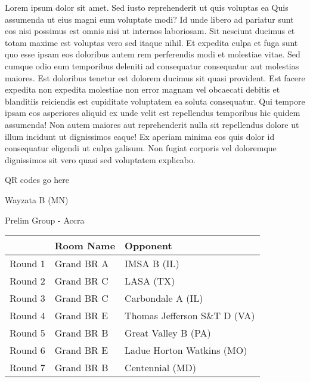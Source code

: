 \documentclass{article}%
\begin{document}
\vspace*{8pt}%
\linebreak%
\newline%
\newline%
Lorem ipsum dolor sit amet. Sed iusto reprehenderit ut quis voluptas ea Quis assumenda ut eius magni eum voluptate modi? Id unde libero ad pariatur sunt eos nisi possimus est omnis nisi ut internos laboriosam. Sit nesciunt ducimus et totam maxime est voluptas vero sed itaque nihil. Et expedita culpa et fuga sunt quo esse ipsam eos doloribus autem rem perferendis modi et molestiae vitae.\newline%
\newline%
Sed cumque odio eum temporibus deleniti ad consequatur consequatur aut molestias maiores. Est doloribus tenetur est dolorem ducimus sit quasi provident. Est facere expedita non expedita molestiae non error magnam vel obcaecati debitis et blanditiis reiciendis est cupiditate voluptatem ea soluta consequatur. Qui tempore ipsam eos asperiores aliquid ex unde velit est repellendus temporibus hic quidem assumenda!\newline%
\newline%
Non autem maiores aut reprehenderit nulla sit repellendus dolore ut illum incidunt ut dignissimos eaque! Ex aperiam minima eos quis dolor id consequatur eligendi ut culpa galisum. Non fugiat corporis vel doloremque dignissimos sit vero quasi sed voluptatem explicabo.\newline%
\newline%
%
\vspace*{30pt}%
\begin{center}%
\begin{Huge}%
QR codes go here%
\end{Huge}%
\end{center}%
\newpage%
%
\begin{center}%
\begin{Huge}%
Wayzata B (MN)%
\end{Huge}%
\vspace*{8pt}%
\linebreak%
\begin{Large}%
Prelim Group {-} Accra%
\end{Large}%
\end{center}%
\begin{tabularx}{\textwidth}{|c|Y|Y|}%
\hline%
&Room Name&Opponent\\%
\hline%
Round 1&Grand BR A&IMSA B (IL)\\%
Round 2&Grand BR C&LASA (TX)\\%
Round 3&Grand BR C&Carbondale A (IL)\\%
Round 4&Grand BR E&Thomas Jefferson S\&T D (VA)\\%
Round 5&Grand BR B&Great Valley B (PA)\\%
Round 6&Grand BR E&Ladue Horton Watkins (MO)\\%
Round 7&Grand BR B&Centennial (MD)\\%
\hline%
\end{tabularx}%
\end{document}
